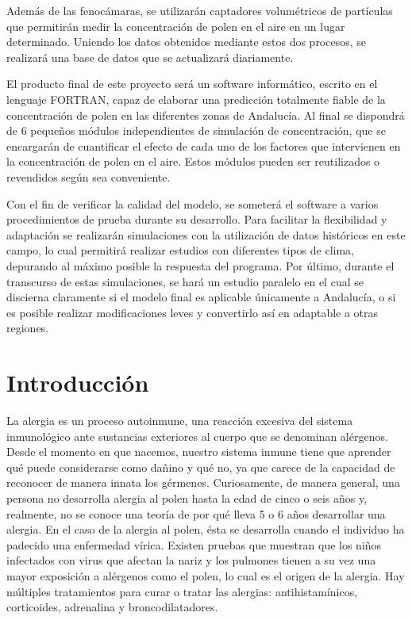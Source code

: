 \documentclass[12pt,oneside,a4paper]{article}
\makeatletter
\numberwithin{figure}{section}
\def\cleardoublepage{\clearpage\if@twoside \ifodd\c@page\else%
\hbox{}%
\thispagestyle{empty}%
\clearpage%
\if@twocolumn\hbox{}\clearpage\fi\fi\fi}
\makeatother
\begin{document}
Además de las fenocámaras, se utilizarán captadores volumétricos de partículas que permitirán medir la concentración de polen en el aire en un lugar determinado. Uniendo los datos obtenidos mediante estos dos procesos, se realizará una base de datos que se actualizará diariamente.

El producto final de este proyecto será un software informático, escrito en el lenguaje FORTRAN, capaz de elaborar una predicción totalmente fiable de la concentración de polen en las diferentes zonas de Andalucía.  Al final se dispondrá de 6 pequeños módulos independientes de simulación de concentración, que se encargarán de cuantificar el efecto de cada uno de los factores que intervienen en la concentración de polen en el aire. Estos módulos pueden ser reutilizados o revendidos según sea conveniente. 

Con el fin de verificar la calidad del modelo, se someterá el software a varios procedimientos de prueba durante su desarrollo. Para facilitar la flexibilidad y adaptación se realizarán simulaciones con la utilización de datos históricos en este campo, lo cual permitirá realizar estudios con diferentes tipos de clima, depurando al máximo posible la respuesta del programa. Por último, durante el transcurso de estas simulaciones, se hará un estudio paralelo en el cual se discierna claramente si el modelo final es aplicable únicamente a Andalucía, o si es posible realizar modificaciones leves y convertirlo así en adaptable a otras regiones. 

\cleardoublepage

\tableofcontents
\cleardoublepage
{}

\cleardoublepage

\section{Introducción}

La alergia es un proceso autoinmune, una reacción excesiva del sistema inmunológico ante sustancias exteriores al cuerpo que se denominan alérgenos. Desde el momento en que nacemos, nuestro sistema inmune tiene que aprender qué puede considerarse como dañino y qué no, ya que carece de la capacidad de reconocer de manera innata los gérmenes. Curiosamente, de manera general, una persona no desarrolla alergia al polen hasta la edad de cinco o seis años y, realmente, no se conoce una teoría de por qué lleva 5 o 6 años desarrollar una alergia. En el caso de la alergia al polen, ésta se desarrolla cuando el individuo ha padecido una enfermedad vírica. Existen pruebas que muestran que los niños infectados con virus que afectan la nariz y los pulmones tienen a su vez una mayor exposición a alérgenos como el polen, lo cual es el origen de la alergia. Hay múltiples tratamientos para curar o tratar las alergias: antihistamínicos, corticoides, adrenalina y broncodilatadores.
\end{document}
